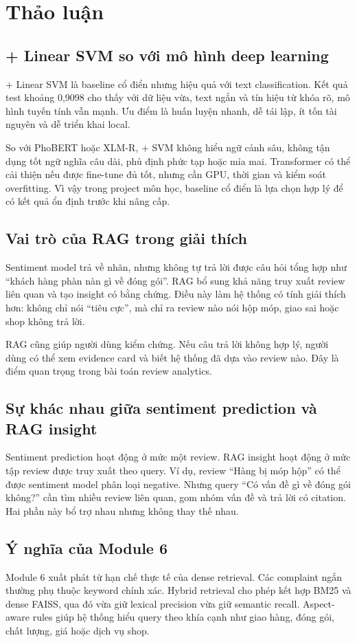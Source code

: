 \chapter{Thảo luận}
\section{\TFIDF{} + Linear SVM so với mô hình deep learning}
\TFIDF{} + Linear SVM là baseline cổ điển nhưng hiệu quả với text classification. Kết quả test \MacroFOne{} khoảng 0,9098 cho thấy với dữ liệu vừa, text ngắn và tín hiệu từ khóa rõ, mô hình tuyến tính vẫn mạnh. Ưu điểm là huấn luyện nhanh, dễ tái lập, ít tốn tài nguyên và dễ triển khai local.

So với PhoBERT hoặc XLM-R, \TFIDF{} + SVM không hiểu ngữ cảnh sâu, không tận dụng tốt ngữ nghĩa câu dài, phủ định phức tạp hoặc mỉa mai. Transformer có thể cải thiện nếu được fine-tune đủ tốt, nhưng cần GPU, thời gian và kiểm soát overfitting. Vì vậy trong project môn học, baseline cổ điển là lựa chọn hợp lý để có kết quả ổn định trước khi nâng cấp.

\section{Vai trò của RAG trong giải thích}
Sentiment model trả về nhãn, nhưng không tự trả lời được câu hỏi tổng hợp như “khách hàng phàn nàn gì về đóng gói”. RAG bổ sung khả năng truy xuất review liên quan và tạo insight có bằng chứng. Điều này làm hệ thống có tính giải thích hơn: không chỉ nói “tiêu cực”, mà chỉ ra review nào nói hộp móp, giao sai hoặc shop không trả lời.

RAG cũng giúp người dùng kiểm chứng. Nếu câu trả lời không hợp lý, người dùng có thể xem evidence card và biết hệ thống đã dựa vào review nào. Đây là điểm quan trọng trong bài toán review analytics.

\section{Sự khác nhau giữa sentiment prediction và RAG insight}
Sentiment prediction hoạt động ở mức một review. RAG insight hoạt động ở mức tập review được truy xuất theo query. Ví dụ, review “Hàng bị móp hộp” có thể được sentiment model phân loại negative. Nhưng query “Có vấn đề gì về đóng gói không?” cần tìm nhiều review liên quan, gom nhóm vấn đề và trả lời có citation. Hai phần này bổ trợ nhau nhưng không thay thế nhau.

\section{Ý nghĩa của Module 6}
Module 6 xuất phát từ hạn chế thực tế của dense retrieval. Các complaint ngắn thường phụ thuộc keyword chính xác. Hybrid retrieval cho phép kết hợp BM25 và dense FAISS, qua đó vừa giữ lexical precision vừa giữ semantic recall. Aspect-aware rules giúp hệ thống hiểu query theo khía cạnh như giao hàng, đóng gói, chất lượng, giá hoặc dịch vụ shop.

